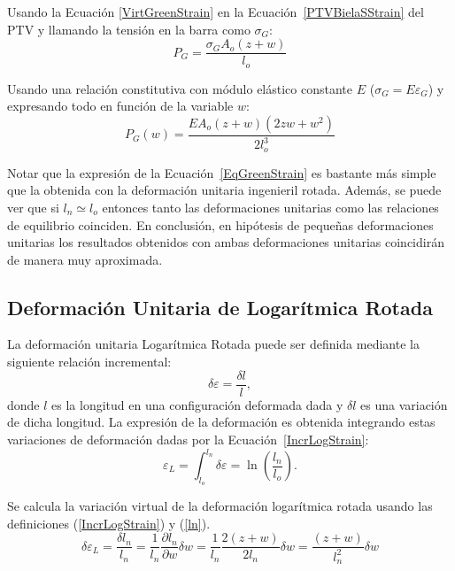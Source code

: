Usando la Ecuación \eqref{VirtGreenStrain} en la Ecuación~\eqref{PTVBielaSStrain} del PTV y llamando la tensión en la barra como $\sigma_G$:
%
\begin{equation}
	P_G = \frac{\sigma_GA_o(z+w)}{l_o}
\end{equation}

Usando una relación constitutiva con módulo elástico constante $E$ ($\sigma_G = E \varepsilon_G$) y expresando todo en función de la variable $w$:
%
\begin{equation}\label{EqGreenStrain}
	\boxed{
		P_G(w) = \frac{EA_o(z+w)\left(2zw+w^2\right)}{2l_o^3}
	}
\end{equation}

Notar que la expresión de la Ecuación~\eqref{EqGreenStrain} es bastante más simple que la obtenida con la deformación unitaria ingenieril rotada. Además, se puede ver que si $l_n\simeq l_o$ entonces tanto las deformaciones unitarias como las relaciones de equilibrio coinciden. En conclusión, en hipótesis de pequeñas deformaciones unitarias los resultados obtenidos con ambas deformaciones unitarias coincidirán de manera muy aproximada.

\subsection{Deformación Unitaria de Logarítmica Rotada}

La deformación unitaria Logarítmica Rotada puede ser definida mediante la siguiente relación incremental:
%
\begin{equation}\label{IncrLogStrain}
	\delta \varepsilon = \frac{\delta l}{l},
\end{equation}
%
donde $l$ es la longitud en una configuración deformada dada y $\delta l$ es una variación de dicha longitud. %
La expresión de la deformación es obtenida integrando estas variaciones de deformación dadas por la Ecuación~\eqref{IncrLogStrain}:
%
\begin{equation}\label{LogStrain}
	\varepsilon_L = \int_{l_o}^{l_n}\delta \varepsilon = \ln\left(\frac{l_n}{l_o}\right).
\end{equation}


Se calcula la variación virtual de la deformación logarítmica rotada usando las definiciones (\ref{IncrLogStrain}) y (\ref{ln}).
%
\begin{equation}\label{VirtLogStrain}
	\delta \varepsilon_L = \frac{\delta l_n}{l_n} = \frac{1}{l_n}\frac{\partial l_n}{\partial w}\delta w = \frac{1}{l_n} \frac{2(z+w)}{2l_n}\delta w = \frac{(z+w)}{l_n^2}\delta w
\end{equation}

